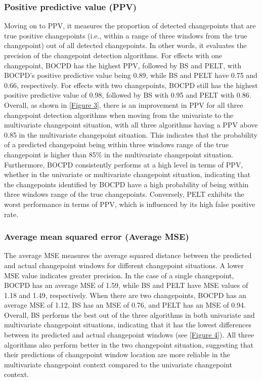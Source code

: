 \documentclass[]{interact}
\theoremstyle{plain}%
\theoremstyle{definition}
\theoremstyle{remark}
\begin{document}
{    \subsubsection{Positive predictive value (PPV)}
    
    \hspace{0.28cm} Moving on to PPV, it measures the proportion of detected changepoints that are true positive changepoints (i.e., within a range of three windows from the true changepoint) out of all detected changepoints. In other words, it evaluates the precision of the changepoint detection algorithms. For effects with one changepoint, BOCPD has the highest PPV, followed by BS and PELT, with BOCPD's positive predictive value being 0.89, while BS and PELT have 0.75 and 0.66, respectively. For effects with two changepoints, BOCPD still has the highest positive predictive value of 0.98, followed by BS with 0.95 and PELT with 0.86. \\
    
    Overall, as shown in \autoref{Figure 3}, there is an improvement in PPV for all three changepoint detection algorithms when moving from the univariate to the multivariate changepoint situation, with all three algorithms having a PPV above 0.85 in the multivariate changepoint situation. This indicates that the probability of a predicted changepoint being within three windows range of the true changepoint is higher than 85\% in the multivariate changepoint situation. Furthermore, BOCPD consistently performs at a high level in terms of PPV, whether in the univariate or multivariate changepoint situation, indicating that the changepoints identified by BOCPD have a high probability of being within three windows range of the true changepoints. Conversely, PELT exhibits the worst performance in terms of PPV, which is influenced by its high false positive rate.

    \subsubsection{Average mean squared error (Average MSE)}
    
    \hspace{0.28cm} The average MSE measures the average squared distance between the predicted and actual changepoint windows for different changepoint situations. A lower MSE value indicates greater precision. In the case of a single changepoint, BOCPD has an average MSE of 1.59, while BS and PELT have MSE values of 1.18 and 1.49, respectively. When there are two changepoints, BOCPD has an average MSE of 1.12, BS has an MSE of 0.76, and PELT has an MSE of 0.94. Overall, BS performs the best out of the three algorithms in both univariate and multivariate changepoint situations, indicating that it has the lowest differences between its predicted and actual changepoint windows (see \autoref{Figure 4}). All three algorithms also perform better in the two changepoint situation, suggesting that their predictions of changepoint window location are more reliable in the multivariate changepoint context compared to the univariate changepoint context.

}
\end{document}
